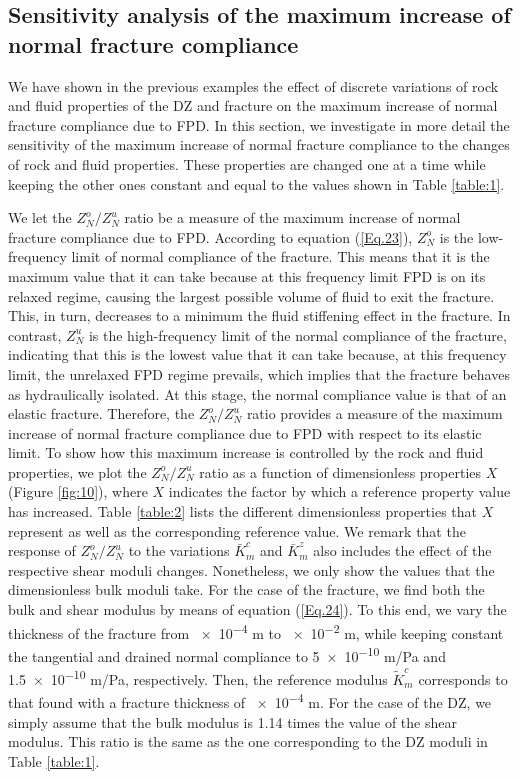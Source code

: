 \documentclass[draft]{agujournal2019}
\begin{document}
\subsection {Sensitivity analysis of the maximum increase of normal fracture compliance}

We have shown in the previous examples the effect of discrete variations of rock and fluid properties of the DZ and fracture on the maximum increase of normal fracture compliance due to FPD. In this section, we investigate in more detail the sensitivity of the maximum increase of normal fracture compliance to the  changes of rock and fluid properties. These properties are changed one at a time while keeping the other ones constant and equal to the values shown in Table \ref{table:1}.

We let the $Z_N^o/Z_N^u$ ratio be a measure of the maximum increase of normal fracture compliance due to FPD. According to equation (\ref{Eq.23}), $Z_N^o$ is the low-frequency limit of normal compliance of the fracture. This means that it is the maximum value that it can take because at this frequency limit FPD is on its relaxed regime,  causing the largest possible volume of fluid  to exit the fracture. This, in turn, decreases to a minimum the fluid stiffening effect in the fracture. In contrast, $Z_N^u$ is the high-frequency limit of the normal compliance of the fracture, indicating that this is the lowest value that it can take because, at this frequency limit, the unrelaxed FPD regime prevails, which implies that the fracture behaves as hydraulically isolated. At this stage, the normal compliance value is that of an elastic fracture. Therefore, the  $Z_N^o/Z_N^u$ ratio provides a measure of the maximum increase of normal fracture compliance due to FPD  with respect to its elastic limit. To show how this maximum increase is controlled by the rock and fluid properties, we plot the $Z_N^o/Z_N^u$ ratio as a function of dimensionless properties $X$ (Figure \ref{fig:10}), where $X$ indicates the factor by which a reference property value has increased. Table \ref{table:2} lists the different dimensionless properties that $X$ represent as well as the corresponding reference value.
We remark that the response of $Z_N^o/Z_N^u$ to the variations $\bar{K}_m^c$ and $\bar{K}_m^z$ also includes the effect of the respective shear moduli changes. Nonetheless, we only show the values that the dimensionless bulk moduli take.
For the case of the fracture, we find  both the bulk and shear modulus by means of equation (\ref{Eq.24}). To this end, we vary the thickness of the fracture from \num{e-4} m to \num{e-2} m, while keeping constant the tangential and drained normal compliance to \num{5e-10} m/Pa and \num{1.5e-10} m/Pa, respectively. Then, the reference modulus $\tilde{K}_m^c$ corresponds to that found with a fracture thickness of \num{e-4} m. For the case of the DZ, we simply assume that the bulk modulus is 1.14 times the value of the shear modulus. This ratio is the same as the one corresponding to the DZ moduli in Table \ref{table:1}.
\end{document}
